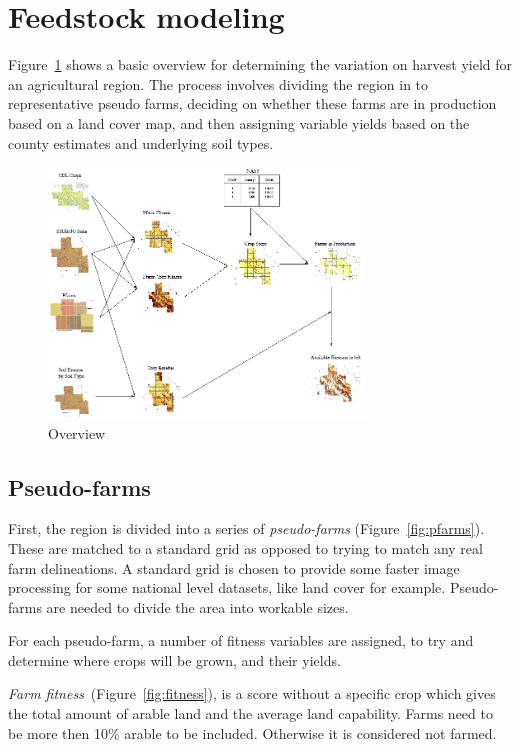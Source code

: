 \documentclass{elsart}
\begin{document}
\section[Implementation]{Feedstock modeling}


Figure~\ref{fig:overview} shows a basic overview for determining the
variation on harvest yield for an agricultural region.  The process
involves dividing the region in to representative pseudo farms, deciding
on whether these farms are in production based on a land cover map,
and then assigning variable yields based on the county estimates and
underlying soil types.

\begin{figure}[hpt]
  \centering
  \includegraphics[width=0.75\textwidth]{iowa/maps.png}  
  \caption{Overview}
  \label{fig:overview}
\end{figure}

\subsection{Pseudo-farms}

First, the region is divided into a series of \emph{pseudo-farms}
(Figure~\ref{fig:pfarms}).  These are matched to a standard grid as
opposed to trying to match any real farm delineations.  A standard grid
is chosen to provide some faster image processing for some national
level datasets, like land cover for example.  Pseudo-farms are needed
to divide the area into workable sizes.

For each pseudo-farm, a number of fitness variables are assigned, to
try and determine where crops will be grown, and their yields.

\emph{Farm fitness}~(Figure~\ref{fig:fitness}), is a score without a
specific crop which gives the total amount of arable land and the
average land capability.  Farms need to be more then 10\% arable to be
included.  Otherwise it is considered not farmed.
\end{document}
